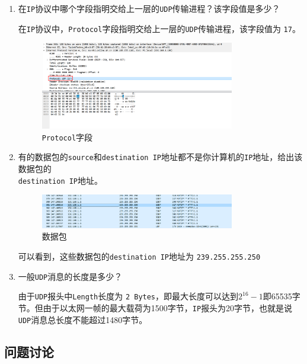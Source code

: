 \documentclass{article}
\begin{document}
\begin{enumerate}[label={\arabic*})]
  \item 在\texttt{IP}协议中哪个字段指明交给上一层的\texttt{UDP}传输进程？该字段值是多少？

        在\texttt{IP}协议中，\texttt{Protocol}字段指明交给上一层的\texttt{UDP}传输进程，该字段值为 \texttt{17}。

        \begin{figure}[H]
          \centering
          \includegraphics[width=0.8\textwidth]{img/7.png}
          \caption{\texttt{Protocol}字段}
        \end{figure}

  \item 有的数据包的\texttt{source}和\texttt{destination IP}地址都不是你计算机的\texttt{IP}地址，给出该数据包的 \\ \texttt{destination IP}地址。

        \begin{figure}[H]
          \centering
          \includegraphics[width=0.8\textwidth]{img/8.png}
          \caption{数据包}
        \end{figure}

        可以看到，这些数据包的\texttt{destination IP}地址为 \texttt{239.255.255.250}

  \item 一般\texttt{UDP}消息的长度是多少？

        由于\texttt{UDP}报头中\texttt{Length}长度为 \texttt{2 Bytes}，即最大长度可以达到$2^{16}-1$即65535字节。但由于以太网一帧的最大载荷为1500字节，\texttt{IP}报头为20字节，也就是说\texttt{UDP}消息总长度不能超过1480字节。

\end{enumerate}

\subsection{问题讨论}
\end{document}

